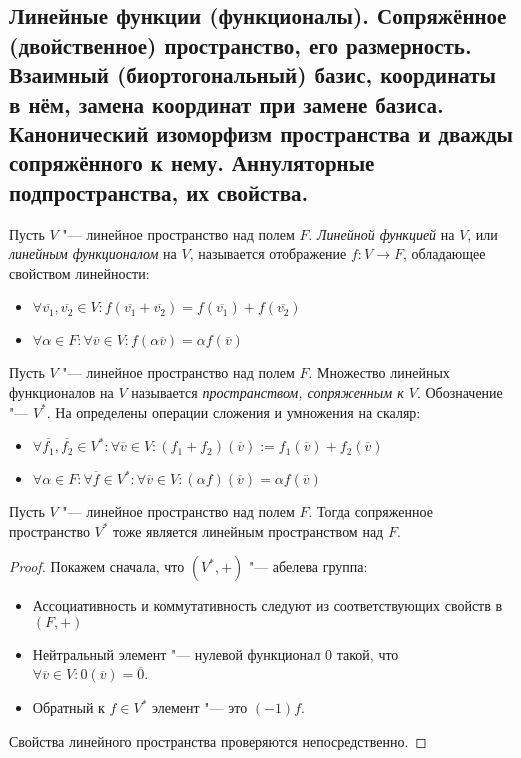 \subsection{Линейные функции (функционалы). Сопряжённое (двойственное) пространство, его размерность. Взаимный (биортогональный) базис, координаты в нём, замена координат при замене базиса. Канонический изоморфизм пространства и дважды сопряжённого к нему. Аннуляторные подпространства, их свойства.}

    \begin{definition}
    	Пусть $V$ "--- линейное пространство над полем $F$. \textit{Линейной функцией} на $V$, или \textit{линейным функционалом} на $V$, называется отображение $f : V \rightarrow F$, обладающее свойством линейности:
    	\begin{itemize}
    		\item $\forall \overline{v_1}, \overline{v_2} \in V: f(\overline{v_1} + \overline{v_2}) = f(\overline{v_1}) + f(\overline{v_2})$
    		\item $\forall \alpha \in F: \forall \overline{v} \in V: f(\alpha\overline{v}) = \alpha f(\overline{v})$
    	\end{itemize}
    \end{definition}
    
    \begin{definition}
    	Пусть $V$ "--- линейное пространство над полем $F$. Множество линейных функционалов на $V$ называется \textit{пространством, сопряженным к $V$}. Обозначение "--- $V^*$. На определены операции сложения и умножения на скаляр:
    	\begin{itemize}
    		\item $\forall \overline{f_1}, \overline{f_2} \in V^*: \forall \overline{v} \in V: (f_1 + f_2)(\overline{v}) := f_1(\overline{v}) + f_2(\overline{v})$
    		\item $\forall \alpha \in F: \forall \overline{f} \in V^*: \forall \overline{v} \in V:(\alpha f)(\overline{v}) = \alpha f(\overline{v})$
    	\end{itemize}
    \end{definition}
    
    \begin{proposition}
    	Пусть $V$ "--- линейное пространство над полем $F$. Тогда сопряженное пространство $V^*$ тоже является линейным пространством над $F$.
    \end{proposition}
    
    \begin{proof}
    	Покажем сначала, что $(V^*, +)$ "--- абелева группа:
    	\begin{itemize}
    		\item Ассоциативность и коммутативность следуют из соответствующих свойств в $(F, +)$
    		\item Нейтральный элемент "--- нулевой функционал $0$ такой, что $\forall \overline{v} \in V: 0(\overline{v}) = \overline{0}$.
    		\item Обратный к $f \in V^*$ элемент "--- это $(-1)f$.
    	\end{itemize}
    
    	Свойства линейного пространства проверяются непосредственно.
    \end{proof}
    

